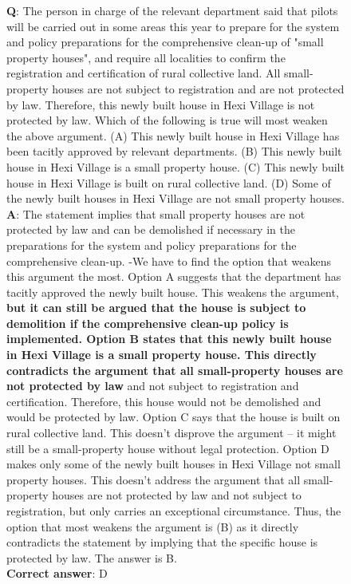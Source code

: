 \begin{figure}[H]
\centering
\begin{tcolorbox}[colback=blue!5!white,colframe=blue!75!black,title=LogiQA example (\phiinstruct)]
\textbf{Q}: The person in charge of the relevant department said that pilots will be carried out in some areas this year to prepare for the system and policy preparations for the comprehensive clean-up of "small property houses", and require all localities to confirm the registration and certification of rural collective land. All small-property houses are not subject to registration and are not protected by law. Therefore, this newly built house in Hexi Village is not protected by law. Which of the following is true will most weaken the above argument. (A) This newly built house in Hexi Village has been tacitly approved by relevant departments. (B) This newly built house in Hexi Village is a small property house. (C) This newly built house in Hexi Village is built on rural collective land. (D) Some of the newly built houses in Hexi Village are not small property houses.\\

\textbf{A}: The statement implies that small property houses are not protected by law and can be demolished if necessary in the preparations for the system and policy preparations for the comprehensive clean-up. -We have to find the option that weakens this argument the most. Option A suggests that the department has tacitly approved the newly built house. This weakens the argument, \textbf{but it can still be argued that the house is subject to demolition if the comprehensive clean-up policy is implemented. Option B states that this newly built house in Hexi Village is a small property house. This directly contradicts the argument that all small-property houses are not protected by law }and not subject to registration and certification. Therefore, this house would not be demolished and would be protected by law. Option C says that the house is built on rural collective land. This doesn't disprove the argument – it might still be a small-property house without legal protection. Option D makes only some of the newly built houses in Hexi Village not small property houses. This doesn't address the argument that all small-property houses are not protected by law and not subject to registration, but only carries an exceptional circumstance. Thus, the option that most weakens the argument is (B) as it directly contradicts the statement by implying that the specific house is protected by law. The answer is B.\\

\textbf{Correct answer}: D
\end{tcolorbox}
\end{figure}

